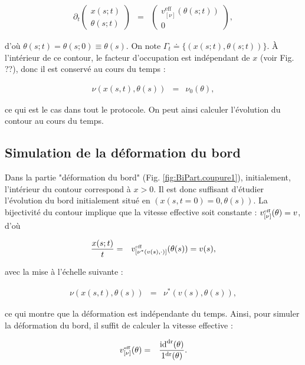 \begin{eqnarray*}
	\partial_t \left( \begin{array}{c} x(s;t) \\ \theta(s;t) \end{array} \right) & = & \left( \begin{array}{c} v^{\mathrm{eff}}_{[\nu]}(\theta(s;t)) \\ 0 \end{array} \right),
\end{eqnarray*}

d’où $\theta(s;t) = \theta(s;0) \equiv \theta(s)$. On note $\Gamma_t \doteq \{(x(s;t), \theta(s;t))\}$. À l’intérieur de ce contour, le facteur d’occupation est indépendant de $x$ (voir Fig. ??), donc il est conservé au cours du temps :

\begin{eqnarray*}
	\nu(x(s,t), \theta(s)) & = & \nu_0(\theta),
\end{eqnarray*}

ce qui est le cas dans tout le protocole. On peut ainsi calculer l’évolution du contour au cours du temps.


\subsection{Simulation de la déformation du bord} 

Dans la partie "déformation du bord" (Fig. \ref{fig:BiPart.coupure1}), initialement, l'intérieur du contour correspond à $x > 0$. Il est donc suffisant d'étudier l'évolution du bord initialement situé en $(x(s, t = 0 ) = 0 , \theta(s))$. La bijectivité du contour implique que la vitesse effective soit constante : $v_{[\nu]}^{\mbox{\tiny eff}} ( \theta  ) = v$, d'où

\begin{eqnarray*}
	\frac{x(s;t)}{t} & = &	v_{[\nu^\ast (  v(s) , \cdot )]}^{\mbox{\tiny eff}} ( \theta(s)  ) = v(s),
\end{eqnarray*}

avec la mise à l’échelle suivante :

\begin{eqnarray*}
	\nu(x(s,t),\theta(s)) & = &  \nu^\ast(v(s),\theta(s)),
\end{eqnarray*}

ce qui montre que la déformation est indépendante du temps. Ainsi, pour simuler la déformation du bord, il suffit de calculer la vitesse effective :

\begin{eqnarray*}
	v_{[\nu]}^{\mbox{\tiny eff}} ( \theta  ) & = & \frac{\mathrm{id}^{\mathrm{dr}}(\theta)}{\mathrm{1}^{\mathrm{dr}}(\theta)}.
\end{eqnarray*}

